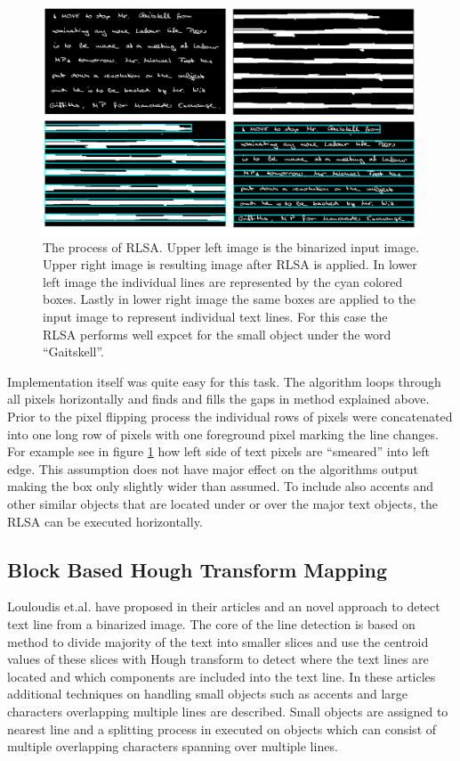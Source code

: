 \documentclass{article}
\begin{document}
          \begin{figure}[!ht]
            \centering
            \includegraphics[natwidth=1516,natheight=912,scale=0.3]{rlsademo.png}
            \caption{The process of RLSA. Upper left image is the binarized input image. Upper right image is resulting image after RLSA is applied. In lower left image the individual lines are represented by the cyan colored boxes. Lastly in lower right image the same boxes are applied to the input image to represent individual text lines. For this case the RLSA performs well expcet for the small object under the word ``Gaitskell''. \label{fig:workingrlsa} }
          \end{figure}

          Implementation itself was quite easy for this task. The algorithm loops through all pixels horizontally and finds and fills the gaps in method explained above. Prior to the pixel flipping process the individual rows of pixels were concatenated into one long row of pixels with one foreground pixel marking the line changes. For example see in figure \ref{fig:workingrlsa} how left side of text pixels are ``smeared'' into left edge. This assumption does not have major effect on the algorithms output making the box only slightly wider than assumed. To include also accents and other similar objects that are located under or over the major text objects, the RLSA can be executed horizontally.

        \subsection{Block Based Hough Transform Mapping}
          Louloudis et.al. have proposed in their articles \cite{Louloudis1} and \cite{Louloudis2} an novel approach to detect text line from a binarized image. The core of the line detection is based on method to divide majority of the text into smaller slices and use the centroid values of these slices with Hough transform to detect where the text lines are located and which components are included into the text line. In these articles additional techniques on handling small objects such as accents and large characters overlapping multiple lines are described. Small objects are assigned to nearest line and a splitting process in executed on objects which can consist of multiple overlapping characters spanning over multiple lines.
\end{document}
